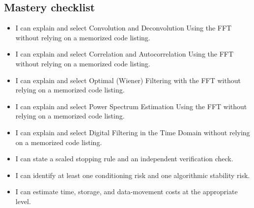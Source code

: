 \documentclass[10pt,letterpaper]{article}
\begin{document}
\subsection*{Mastery checklist}
\begin{itemize}
\item[$\square$] I can explain and select Convolution and Deconvolution Using the FFT without relying on a memorized code listing.
\item[$\square$] I can explain and select Correlation and Autocorrelation Using the FFT without relying on a memorized code listing.
\item[$\square$] I can explain and select Optimal (Wiener) Filtering with the FFT without relying on a memorized code listing.
\item[$\square$] I can explain and select Power Spectrum Estimation Using the FFT without relying on a memorized code listing.
\item[$\square$] I can explain and select Digital Filtering in the Time Domain without relying on a memorized code listing.
\item[$\square$] I can state a scaled stopping rule and an independent verification check.
\item[$\square$] I can identify at least one conditioning risk and one algorithmic stability risk.
\item[$\square$] I can estimate time, storage, and data-movement costs at the appropriate level.
\end{itemize}
\end{document}
